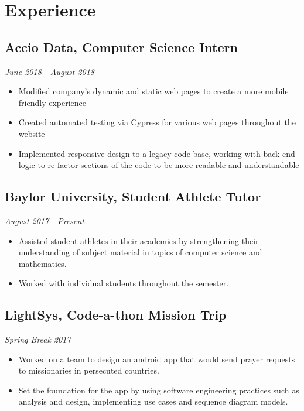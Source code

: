 \documentclass{article}
\begin{document}
\section{Experience}

\subsection{Accio Data, Computer Science Intern}
\hfill\textit{June 2018 - August 2018}

\begin{itemize}
	\item Modified company's dynamic and static web pages to create a more
	mobile friendly experience
	\item Created automated testing via Cypress for various web pages
	throughout the website
	\item Implemented responsive design to a legacy code base, working with
	back end logic to re-factor sections of the code to be more
	readable and understandable  
\end{itemize}

\subsection{Baylor University, Student Athlete Tutor} 
\hfill\textit{August 2017 - Present}

\begin{itemize}
	\item Assisted student athletes in their academics by strengthening their understanding of subject material in topics of computer science and mathematics.
	
	\item Worked with individual students throughout the semester. 
\end{itemize}

\subsection{LightSys, Code-a-thon Mission Trip}
\hfill
\textit{Spring Break 2017}

\begin{itemize}
	\item Worked on a team to design an android app that would send prayer requests
	to missionaries in persecuted countries. 

	\item Set the foundation for the app by using software engineering practices such as analysis and design, implementing use cases and sequence diagram models.
\end{itemize}
  
\end{document}

